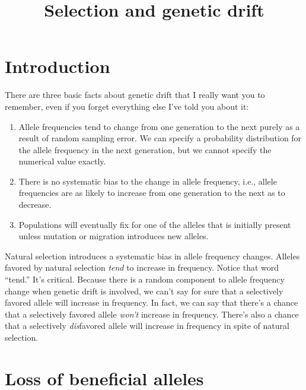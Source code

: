 \documentclass[12pt]{article}
\title{Selection and genetic drift}
\begin{document}
\maketitle

\thispagestyle{first}

\section*{Introduction}

There are three basic facts about genetic drift that I really want you
to remember, even if you forget everything else I've told you about
it:

\begin{enumerate}

\item Allele frequencies tend to change from one generation to the
next purely as a result of random sampling error. We can specify a
probability distribution for the allele frequency in the next
generation, but we cannot specify the numerical value exactly.

\item There is no systematic bias to the change in allele frequency,
i.e., allele frequencies are as likely to increase from one generation
to the next as to decrease.

\item Populations will eventually fix for one of the alleles that is
initially present unless mutation or migration introduces new
alleles. 

\end{enumerate}

Natural selection introduces a systematic bias in allele frequency
changes. Alleles favored by natural selection {\it tend\/} to increase
in frequency. Notice that word ``tend.'' It's critical. Because there
is a random component to allele frequency change when genetic drift is
involved, we can't say for sure that a selectively favored allele will
increase in frequency. In fact, we can say that there's a chance that
a selectively favored allele {\it won't\/} increase in
frequency. There's also a chance that a selectively {\it dis\/}favored
allele will increase in frequency in spite of natural selection.

\section*{Loss of beneficial alleles}
\end{document}
